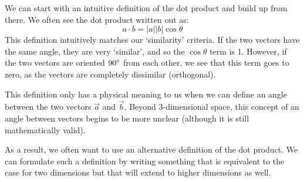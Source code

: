 We can start with an intuitive definition of the dot product and build up from there. We often see the dot product written out as: $$a\cdot b=|a||b|\cos\theta$$
This definition intuitively matches our `similarity' criteria. If the two vectors have the same angle, they are very `similar', and so the $\cos\theta$ term is 1. However, if the two vectors are oriented $90\degree$ from each other, we see that this term goes to zero, as the vectors are completely dissimilar (orthogonal).

This definition only has a physical meaning to us when we can define an angle between the two vectors $\vec{a}$ and $\vec{b}$. Beyond 3-dimensional space, this concept of an angle between vectors begins to be more unclear (although it is still mathematically valid).

As a result, we often want to use an alternative definition of the dot product. We can formulate such a definition by writing something that is equivalent to the case for two dimensions but that will extend to higher dimensions as well.

